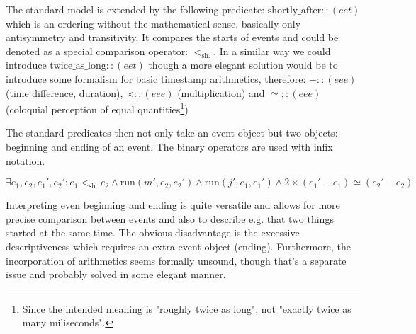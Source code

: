 \documentclass{article}
\renewcommand\t[1]{\text{#1}}
\begin{document}
The standard model is extended by the following predicate: $\t{shortly\_after} :: (eet)$ which is an ordering without the mathematical sense, basically only antisymmetry and transitivity. It compares the starts of events and could be denoted as a special comparison operator: $<_\t{sh.}$. In a similar way we could introduce $\t{twice\_as\_long} :: (eet)$ though a more elegant solution would be to introduce some formalism for basic timestamp arithmetics, therefore: $- :: (eee)$ (time difference, duration), $\times :: (eee)$ (multiplication) and $\simeq :: (eee)$ (coloquial perception of equal quantities\footnote{Since the intended meaning is "roughly twice as long", not "exactly twice as many miliseconds".}) 

The standard predicates then not only take an event object but two objects: beginning and ending of an event. The binary operators are used with infix notation.

$$
\exists e_1, e_2,e_1',e_2': e_1 <_\t{sh.} e_2 \wedge \t{run}(m',e_2,e_2') \wedge \t{run}(j',e_1,e_1') \wedge 2\times (e_1'-e_1) \simeq (e_2'-e_2)
$$

Interpreting even beginning and ending is quite versatile and allows for more precise comparison between events and also to describe e.g. that two things started at the same time.
The obvious disadvantage is the excessive descriptiveness which requires an extra event object (ending). Furthermore, the incorporation of arithmetics seems formally unsound, though that's a separate issue and probably solved in some elegant manner.
\end{document}
